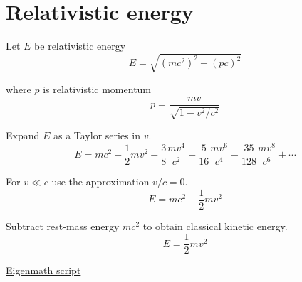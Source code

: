 

\section*{Relativistic energy}

Let $E$ be relativistic energy
\begin{equation*}
E=\sqrt{(mc^2)^2+(pc)^2}
\end{equation*}

where $p$ is relativistic momentum
\begin{equation*}
p=\frac{mv}{\sqrt{1-v^2/c^2}}
\end{equation*}

Expand $E$ as a Taylor series in $v$.
\begin{equation*}
E=mc^2+\frac{1}{2}mv^2-\frac{3}{8}\frac{mv^4}{c^2}
+\frac{5}{16}\frac{mv^6}{c^4}-\frac{35}{128}\frac{mv^8}{c^6}+\cdots
\end{equation*}

For $v\ll c$ use the approximation $v/c=0$.
\begin{equation*}
E=mc^2+\frac{1}{2}mv^2
\end{equation*}

Subtract rest-mass energy $mc^2$ to obtain classical kinetic energy.
\begin{equation*}
E=\frac{1}{2}mv^2
\end{equation*}

\href{https://georgeweigt.github.io/examples/relativistic-energy-demo.html}{Eigenmath script}


